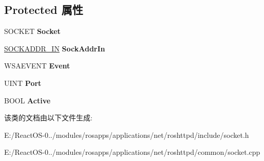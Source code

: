 \subsection*{Protected 属性}
\begin{DoxyCompactItemize}
\item 
\mbox{\label{class_c_socket_a2afe50fb2984d76724b43a350e619f32}} 
S\+O\+C\+K\+ET {\bfseries Socket}
\item 
\mbox{\label{class_c_socket_abee43f34b71976c59a1ee5be09220871}} 
\hyperlink{structsockaddr__in}{S\+O\+C\+K\+A\+D\+D\+R\+\_\+\+IN} {\bfseries Sock\+Addr\+In}
\item 
\mbox{\label{class_c_socket_a19b126fc4c73f3773ff11ab7286f677d}} 
W\+S\+A\+E\+V\+E\+NT {\bfseries Event}
\item 
\mbox{\label{class_c_socket_a306decd45310aa96c3ef143453de0e16}} 
U\+I\+NT {\bfseries Port}
\item 
\mbox{\label{class_c_socket_aaf5a3840c6d085572591e7d51dd34243}} 
B\+O\+OL {\bfseries Active}
\end{DoxyCompactItemize}


该类的文档由以下文件生成\+:\begin{DoxyCompactItemize}
\item 
E\+:/\+React\+O\+S-\/0../modules/rosapps/applications/net/roshttpd/include/socket.\+h\item 
E\+:/\+React\+O\+S-\/0../modules/rosapps/applications/net/roshttpd/common/socket.\+cpp\end{DoxyCompactItemize}
